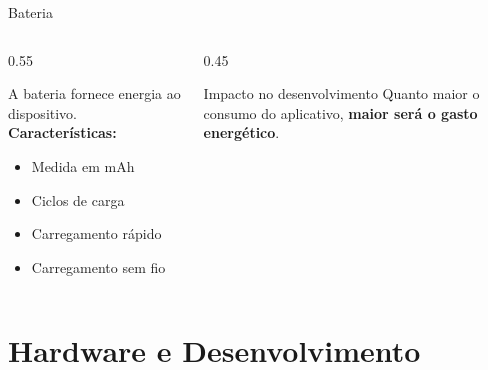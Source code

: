 \documentclass[aspectratio=169]{beamer}
\begin{document}
\begin{frame}{Bateria}
    \begin{columns}[T]
        \begin{column}{0.55\textwidth}
            \begin{block}{A bateria fornece energia ao dispositivo.}
                \textbf{Características:}
                \begin{itemize}
                    \item Medida em mAh
                    \item Ciclos de carga
                    \item Carregamento rápido
                    \item Carregamento sem fio
                \end{itemize}
            \end{block}
        \end{column}
        \begin{column}{0.45\textwidth}
            \begin{alertblock}{Impacto no desenvolvimento}
                Quanto maior o consumo do aplicativo, \textbf{maior será o gasto energético}.
            \end{alertblock}
        \end{column}
    \end{columns}
\end{frame}

\section{Hardware e Desenvolvimento}
\end{document}
